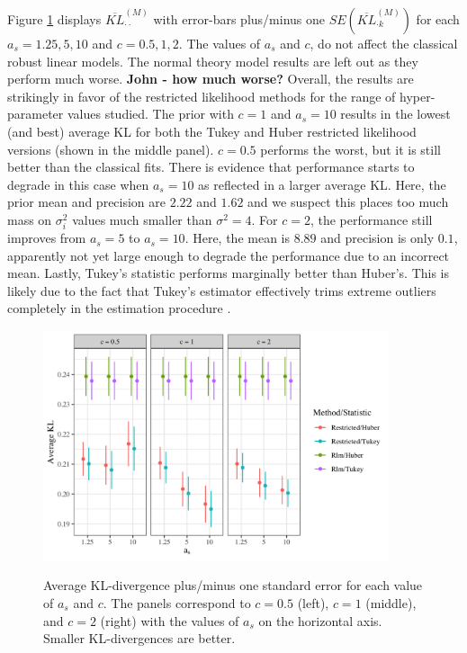 \documentclass[ba]{imsart}
\begin{document}
Figure \ref{kl_sim} displays $\overline{KL}^{(M)}_{{\cdot}{\cdot}}$  with error-bars plus/minus one $SE(\overline{KL}^{(M)}_{{\cdot} k})$ for each $a_{s} = 1.25,  5, 10$ and $c = 0.5, 1, 2$. %
The values of $a_{s}$ and $c$, do not affect the classical robust linear models. The normal theory model results are left out as they perform much worse. {\bf John - how much worse?} Overall, the results are strikingly in favor of the restricted likelihood methods for the range of hyper-parameter values studied. The prior with $c = 1$ and $a_{s} = 10$ results in the lowest (and best) average KL for both the Tukey and Huber restricted likelihood versions (shown in the middle panel). $c = 0.5$ performs the worst, but it is still better than the classical fits. There is evidence that performance starts to degrade in this case when $a_{s} = 10$ as reflected in a larger average KL. Here, the prior mean and precision are $2.22$ and $1.62$ and we suspect this places too much mass on $\sigma^{2}_{i}$ values much smaller than $\sigma^{2}=4$. For $c = 2$, the performance still improves from $a_{s} = 5$ to $a_{s} = 10$. Here, the mean is $8.89$ and precision is only $0.1$, apparently not yet large enough to degrade the performance due to an incorrect mean. Lastly, Tukey's statistic performs marginally better than Huber's. This is likely due to the fact that Tukey's estimator effectively trims extreme outliers completely in the estimation procedure \citep{huber2009}.
 
\begin{figure}[t]
\centering
\includegraphics[width = 4in]{kl_sim2_facet_scale.png}
\label{kl_sim}
\caption{Average KL-divergence plus/minus one standard error for each value of $a_{s}$ and $c$. The panels correspond to $c = 0.5$ (left), $c=1$ (middle), and $c=2$ (right) with the values of $a_{s}$ on the horizontal axis.  Smaller KL-divergences are better.}
\end{figure}
\end{document}
